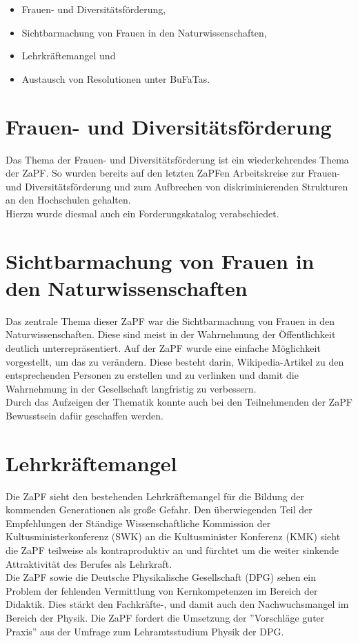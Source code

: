 \documentclass{scrartcl}
\begin{document}
\begin{itemize}
\item Frauen- und Diversitätsförderung,
\item Sichtbarmachung von Frauen in den Naturwissenschaften,
\item Lehrkräftemangel und
\item Austausch von Resolutionen unter BuFaTas. %
\end{itemize}

\section*{Frauen- und Diversitätsförderung}
Das Thema der Frauen- und Diversitätsförderung ist ein wiederkehrendes Thema der ZaPF. So wurden bereits auf den letzten ZaPFen Arbeitskreise zur Frauen- und Diversitätsförderung und zum Aufbrechen von diskriminierenden Strukturen an den Hochschulen gehalten.\\
Hierzu wurde diesmal auch ein Forderungskatalog verabschiedet.

\section*{Sichtbarmachung von Frauen in den Naturwissenschaften}
Das zentrale Thema dieser ZaPF war die Sichtbarmachung von Frauen in den Naturwissenschaften. Diese sind meist in der Wahrnehmung der Öffentlichkeit deutlich unterrepräsentiert. 
Auf der ZaPF wurde eine einfache Möglichkeit vorgestellt, um das zu verändern. Diese besteht darin, Wikipedia-Artikel zu den entsprechenden Personen zu erstellen und zu verlinken und damit die Wahrnehmung in der Gesellschaft langfristig zu verbessern.\\ 
Durch das Aufzeigen der Thematik konnte auch bei den Teilnehmenden der ZaPF Bewusstsein dafür geschaffen werden.

\section*{Lehrkräftemangel}
Die ZaPF sieht den bestehenden Lehrkräftemangel für die Bildung der kommenden Generationen als große Gefahr. Den überwiegenden Teil der Empfehlungen der Ständige Wissenschaftliche Kommission der Kultusministerkonferenz (SWK) an die Kultusminister Konferenz (KMK) sieht die ZaPF teilweise als kontraproduktiv an und fürchtet um die weiter sinkende Attraktivität des Berufes als Lehrkraft.\\
Die ZaPF sowie die Deutsche Physikalische Gesellschaft (DPG) sehen ein Problem der fehlenden Vermittlung von Kernkompetenzen im Bereich der Didaktik. Dies stärkt den Fachkräfte-, und damit auch den Nachwuchsmangel im Bereich der Physik. Die ZaPF fordert die Umsetzung der ''Vorschläge guter Praxis'' aus der Umfrage zum Lehramtsstudium Physik der DPG. 
\end{document}
